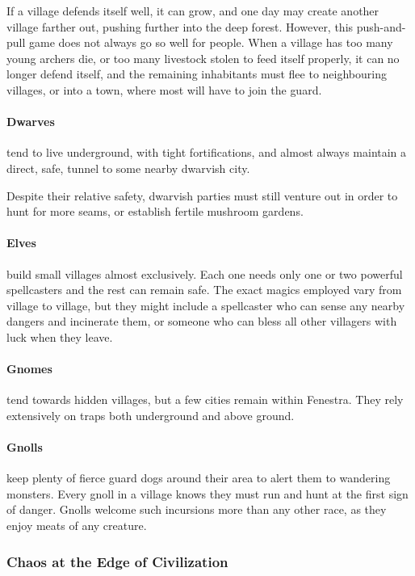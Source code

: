 \begin{multicols}{2}
If a village defends itself well, it can grow, and one day may create another village farther out, pushing further into the deep forest.
However, this push-and-pull game does not always go so well for people.
When a village has too many young archers die, or too many livestock stolen to feed itself properly, it can no longer defend itself, and the remaining inhabitants must flee to neighbouring villages, or into a town, where most will have to join the \gls{guard}.

\paragraph{Dwarves} tend to live underground, with tight fortifications, and almost always maintain a direct, safe, tunnel to some nearby dwarvish city.

Despite their relative safety, dwarvish parties must still venture out in order to hunt for more seams, or establish fertile mushroom gardens.

\paragraph{Elves} build small villages almost exclusively.
Each one needs only one or two powerful spellcasters and the rest can remain safe.
The exact magics employed vary from village to village, but they might include a spellcaster who can sense any nearby dangers and incinerate them, or someone who can bless all other villagers with luck when they leave.

\paragraph{Gnomes} tend towards hidden villages, but a few cities remain within Fenestra.
They rely extensively on traps both underground and above ground.

\paragraph{Gnolls} keep plenty of fierce guard dogs around their area to alert them to wandering monsters.
Every gnoll in a village knows they must run and hunt at the first sign of danger.
Gnolls welcome such incursions more than any other race, as they enjoy meats of any creature.

\subsubsection{Chaos at the Edge of Civilization}


\end{multicols}
